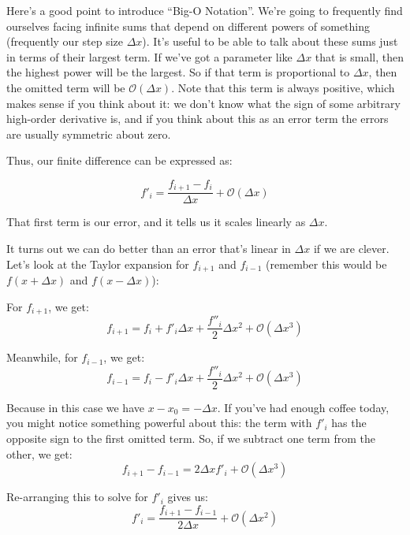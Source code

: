 \documentclass{article}
\theoremstyle{demo}
\begin{document}
Here's a good point to introduce ``Big-O Notation''.  We're going to frequently
find ourselves facing infinite sums that depend on different powers of something
(frequently our step size $\Delta x$).  It's useful to be able to talk about
these sums just in terms of their largest term.  If we've got a parameter like
$\Delta x$ that is small, then the highest power will be the largest.  So if
that term is proportional to $\Delta x$, then the omitted term will be
$\mathcal{O}(\Delta x)$.  Note that this term is always positive, which makes
sense if you think about it: we don't know what the sign of some arbitrary
high-order derivative is, and if you think about this as an error term the
errors are usually symmetric about zero.

Thus, our finite difference can be expressed as:

\begin{equation}
    f'_i = \frac{f_{i+1} - f_i}{\Delta x} + \mathcal{O}(\Delta x)
\end{equation}

That first term is our error, and it tells us it scales linearly as $\Delta x$.

It turns out we can do better than an error that's linear in $\Delta x$ if we
are clever.  Let's look at the Taylor expansion for $f_{i+1}$ and $f_{i-1}$
(remember this would be $f(x+\Delta x)$ and $f(x-\Delta x)$):

For $f_{i+1}$, we get:
\begin{equation}
    f_{i+1} = f_i + f'_i \Delta x + \frac{f''_i}{2}\Delta x^2 +
    \mathcal{O}(\Delta x^3)
    \label{fipone}
\end{equation}

Meanwhile, for $f_{i-1}$, we get:
\begin{equation}
    f_{i-1} = f_i - f'_i \Delta x + \frac{f''_i}{2}\Delta x^2 +
    \mathcal{O}(\Delta x^3)
    \label{fimone}
\end{equation}

Because in this case we have $x-x_0 = -\Delta x$.  If you've had enough coffee
today, you might notice something powerful about this:  the term with $f'_i$ has
the opposite sign to the first omitted term.  So, if we subtract one term from
the other, we get:
\begin{equation}
    f_{i+1} - f_{i-1} = 2\Delta x f'_i + \mathcal{O}(\Delta x^3)
\end{equation}

Re-arranging this to solve for $f'_i$ gives us:
\begin{equation}
    f'_i = \frac{f_{i+1} - f_{i-1}}{2\Delta x}  + \mathcal{O}(\Delta x^2)
    \label{central_diff}
\end{equation}
\end{document}
